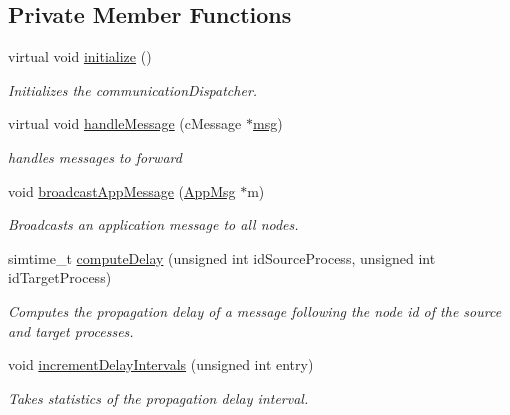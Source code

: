 \subsection*{Private Member Functions}
\begin{DoxyCompactItemize}
\item 
virtual void \hyperlink{class_communication_dispatcher_ab44887658841bb5ab59c554c1738c8f3}{initialize} ()
\begin{DoxyCompactList}\small\item\em Initializes the communication\+Dispatcher. \end{DoxyCompactList}\item 
virtual void \hyperlink{class_communication_dispatcher_af7be3dbf46282e78d41d3d194f5ff246}{handle\+Message} (c\+Message $\ast$\hyperlink{_controller_8h_afa0f3b802fbc219228f7bb97996fa558}{msg})
\begin{DoxyCompactList}\small\item\em handles messages to forward \end{DoxyCompactList}\item 
void \hyperlink{class_communication_dispatcher_a589821f510801091f753f9812e3d1ee7}{broadcast\+App\+Message} (\hyperlink{class_app_msg}{App\+Msg} $\ast$m)
\begin{DoxyCompactList}\small\item\em Broadcasts an application message to all nodes. \end{DoxyCompactList}\item 
simtime\+\_\+t \hyperlink{class_communication_dispatcher_acf6f743d35e72c71d61275ad25cdc306}{compute\+Delay} (unsigned int id\+Source\+Process, unsigned int id\+Target\+Process)
\begin{DoxyCompactList}\small\item\em Computes the propagation delay of a message following the node id of the source and target processes. \end{DoxyCompactList}\item 
void \hyperlink{class_communication_dispatcher_ab87c3d69a5953f9bda369d53c2de90d7}{increment\+Delay\+Intervals} (unsigned int entry)
\begin{DoxyCompactList}\small\item\em Takes statistics of the propagation delay interval. \end{DoxyCompactList}\end{DoxyCompactItemize}

